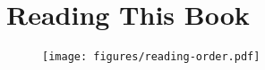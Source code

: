 \section{Reading This Book}
\label{readme}
\paragraph{} 

\begin{figure}[H]
\centering
\texttt{[image: figures/reading-order.pdf]}
\label{fig:reading-order}
\end{figure}



